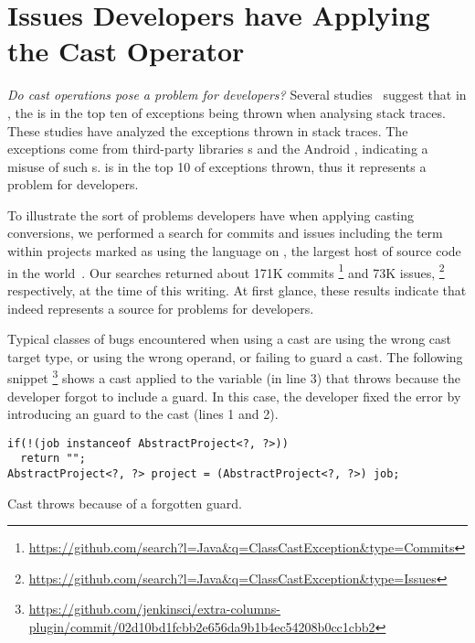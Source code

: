 \section{Issues Developers have Applying the Cast Operator}
\label{sec:casts:issues}

\emph{Do cast operations pose a problem for developers?}
Several studies~\citep{kechagiaUndocumentedUncheckedExceptions2014,coelhoUnveilingExceptionHandling2015,zhitnitskyTop10Exception2016}
suggest that in \java{},
the  is in the top ten of exceptions being thrown when analysing stack traces.
These studies have analyzed the exceptions thrown in stack traces.
The exceptions come from third-party libraries \api{}s and the Android \api{},
indicating a misuse of such \api{}s.
 is in the top 10 of exceptions thrown,
thus it represents a problem for developers.

To illustrate the sort of problems developers have when applying casting conversions,
we performed a search for commits and issues including the term
 within projects marked as using the \java{} language
on \github{},
the largest host of source code in the world~\citep{gousiosLeanGHTorrentGitHub2014}.
Our searches returned about 171K commits%
\footnote{\url{https://github.com/search?l=Java&q=ClassCastException&type=Commits}}
and 73K issues,%
\footnote{\url{https://github.com/search?l=Java&q=ClassCastException&type=Issues}}
respectively, at the time of this writing.
At first glance, these results indicate that  indeed
represents a source for problems for developers.

Typical classes of bugs encountered when using a cast are using the wrong cast target type,
or using the wrong operand, or failing to guard a cast.
The following snippet%
\footnote{\url{https://github.com/jenkinsci/extra-columns-plugin/commit/02d10bd1fcbb2e656da9b1b4ec54208b0cc1cbb2}}
shows a cast applied to the variable  (in line 3) that throws  because the developer forgot to include a guard.
In this case, the developer fixed the error by introducing an  guard to the cast (lines 1 and 2).

\begin{listing}
\begin{verbatim}
if(!(job instanceof AbstractProject<?, ?>))
  return "";
AbstractProject<?, ?> project = (AbstractProject<?, ?>) job;
\end{verbatim}
\caption{Cast throws  because of a forgotten guard.}
\end{listing}

